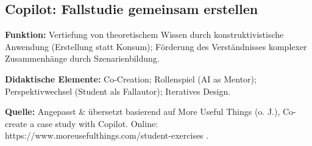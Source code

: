 \documentclass[
  ngerman,
  letterpaper,
  DIV=11]{scrreprt}
\begin{document}
\subsection{Copilot: Fallstudie gemeinsam
erstellen}\label{sec-prompt-fallstudie-erstellen}

\textbf{Funktion:} Vertiefung von theoretischem Wissen durch
konstruktivistische Anwendung (Erstellung statt Konsum); Förderung des
Verständnisses komplexer Zusammenhänge durch Szenarienbildung.

\textbf{Didaktische Elemente:} Co-Creation; Rollenspiel (AI as Mentor);
Perspektivwechsel (Student als Fallautor); Iteratives Design.

\textbf{Quelle:} Angepasst \& übersetzt basierend auf More Useful Things
(o. J.), Co-create a case study with Copilot. Online:
https://www.moreusefulthings.com/student-exercises .
\end{document}
